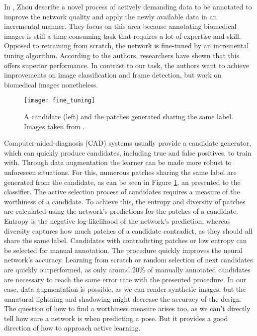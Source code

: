 In \cite{zhou}, Zhou \etal describe a novel process of actively demanding data to be annotated to improve the network quality and apply the newly available data in an incremental manner. They focus on this area because annotating biomedical images is still a time-consuming task that requires a lot of expertise and skill.
\nnewline
Opposed to retraining from scratch, the network is fine-tuned by an incremental tuning algorithm. According to the authors, researchers have shown that this offers superior performance. In contrast to our task, the authors want to achieve improvements on image classification and frame detection, but work on biomedical images nonetheless.
\nnewline
\begin{figure}[!tbp]
	\centering
    \texttt{[image: fine\_tuning]}
	\caption{A candidate (left) and the patches generated sharing the same label. Images taken from \cite{zhou}.}
	\label{fig:zhou}
\end{figure}
Computer-aided-diagnosis (CAD) systems usually provide a candidate generator, which can quickly produce candidates, including true and false positives, to train with. Through data augmentation the learner can be made more robust to unforeseen situations. For this, numerous patches sharing the same label are generated from the candidate, as can be seen in Figure \ref{fig:zhou}, an presented to the classifier. 
\nnewline
The active selection process of candidates requires a measure of the worthiness of a candidate. To achieve this, the entropy and diversity of patches are calculated using the network's predictions for the patches of a candidate. Entropy is the negative log-likelihood of the network's prediction, whereas diversity captures how much patches of a candidate contradict, as they should all share the same label. Candidates with contradicting patches or low entropy can be selected for manual annotation.
\nnewline
The procedure quickly improves the neural network's accuracy. Learning from scratch or random selection of next candidates are quickly  outperformed, as only around 20\% of manually annotated candidates are necessary to reach the same error rate with the presented procedure.
\nnewline
In our case, data augmentation is possible, as we can render synthetic images, but the unnatural lightning and shadowing might decrease the accuracy of the design. The question of how to find  a worthiness measure arises too, as we can't directly tell how sure a network is when predicting a pose. But it provides a good direction of how to approach active learning.

